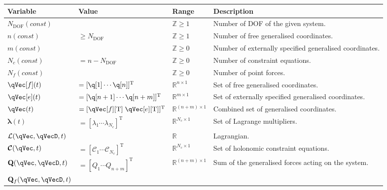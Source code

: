 \documentclass[11pt]{article}
\begin{document}
\begin{center}
\begin{threeparttable}
\begin{tabular}{llll}
    \textbf{Variable} & \textbf{Value} & \textbf{Range} & \textbf{Description}\\
    \hline
    $N_{\mathrm{DOF}}(const)$
        &
        & $\mathbb{Z} \geq 1$
        & Number of DOF of the given system. \\
    $n(const)$
        & $\geq N_{\mathrm{DOF}}$
        & $\mathbb{Z} \geq 1$
        & Number of free generalised coordinates. \\
    $m(const)$
        &
        & $\mathbb{Z} \geq 0$
        & Number of externally specified generalised coordinates. \\
    $N_c(const)$
        & $=n - N_{\mathrm{DOF}}$
        & $\mathbb{Z} \geq 0$
        & Number of constraint equations. \\
    $N_f(const)$
        &
        & $\mathbb{Z} \geq 0$
        & Number of point forces. \\
    $\qVec[f](t)$
        & $=[\q[1] \cdots \q[n]]^{\mathrm{T}}$
        & $\mathbb{R}^{n\times1}$
        & Set of free generalised coordinates. \\
    $\qVec[e](t)$
        & $=[\q[n+1] \cdots \q[n+m]]^{\mathrm{T}}$
        & $\mathbb{R}^{m\times1}$
        & Set of externally specified generalised coordinates. \\
    $\qVec(t)$
        & $=[\qVec[f][\mathrm{T}] \; \qVec[e][\mathrm{T}]]^{\mathrm{T}}$
        & $\mathbb{R}^{(n+m)\times1}$
        & Combined set of generalised coordinates. \\
    $\bm{\lambda}(t)$
        & $=[\lambda_1 \cdots \lambda_{N_c}]^{\mathrm{T}}$
        & $\mathbb{R}^{N_c\times1}$
        & Set of Lagrange multipliers. \\
    $\mathcal{L}(\qVec, \qVecD, t)$
        &
        & $\mathbb{R}$
        & Lagrangian. \\
    $\bm{\mathcal{C}}(\qVec, t)$
        & $=[\mathcal{C}_1 \cdots \mathcal{C}_{N_c}]^{\mathrm{T}}$
        & $\mathbb{R}^{N_c\times1}$
        & Set of holonomic constraint equations\tnote{1}. \\
    $\mathbf{Q}(\qVec, \qVecD, t)$
        & $=[Q_1 \cdots Q_{n+m}]^{\mathrm{T}}$
        & $\mathbb{R}^{(n+m)\times1}$
        & Sum of the generalised forces acting on the system\tnote{2}. \\
    $\mathbf{Q}_f(\qVec, \qVecD, t)$

\end{tabular}
\end{threeparttable}
\end{center}
\end{document}
